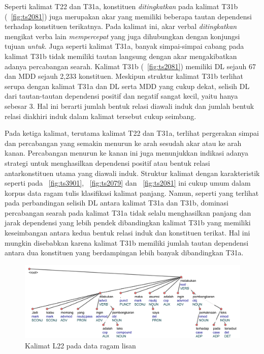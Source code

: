 Seperti kalimat T22 dan T31a, konstituen \textit{ditingkatkan} pada kalimat T31b (\pic~\ref{fig:ts2081}) juga merupakan akar yang memiliki beberapa tautan dependensi terhadap konstituen terikatnya. Pada kalimat ini, akar verbal \textit{ditingkatkan} mengikat verba lain \textit{mempercepat} yang juga dihubungkan dengan konjungsi tujuan \textit{untuk}. Juga seperti kalimat T31a, banyak simpai-simpai cabang pada kalimat T31b tidak memiliki tautan langsung dengan akar mengakibatkan adanya percabangan searah. Kalimat T31b (\pic~\ref{fig:ts2081}) memiliki DL sejauh 67 dan MDD sejauh 2,233 konstituen. Meskipun struktur kalimat T31b terlihat serupa dengan kalimat T31a dan DL serta MDD yang cukup dekat, selisih DL dari tautan-tautan dependensi positif dan negatif sangat kecil, yaitu hanya sebesar 3. Hal ini berarti jumlah bentuk relasi diawali induk dan jumlah bentuk relasi diakhiri induk dalam kalimat tersebut cukup seimbang. 

Pada ketiga kalimat, terutama kalimat T22 dan T31a, terlihat pergerakan simpai dan percabangan yang semakin menurun ke arah sesudah akar atau ke arah kanan. Percabangan menurun ke kanan ini juga menunjukkan indikasi adanya strategi untuk menghasilkan dependensi positif atau bentuk relasi antarkonstituen utama yang diawali induk. Struktur kalimat dengan karakteristik seperti pada \pic~\ref{fig:ts3901}, \pic~\ref{fig:ts2079} dan \pic~\ref{fig:ts2081} ini cukup umum dalam korpus data ragam tulis klasifikasi kalimat panjang. Namun, seperti yang terlihat pada perbandingan selisih DL antara kalimat T31a dan T31b, dominasi percabangan searah pada kalimat T31a tidak selalu menghasilkan panjang dan jarak dependensi yang lebih pendek dibandingkan kalimat T31b yang memiliki keseimbangan antara kedua bentuk relasi induk dan konstituen terikat. Hal ini mungkin disebabkan karena kalimat T31b memiliki jumlah tautan dependensi antara dua konstituen yang berdampingan lebih banyak dibandingkan T31a.

\begin{figure}
	\centering \includegraphics[width=1
	\textwidth] {pics/ls6521.jpg} 
	\caption{Kalimat L22 pada data ragam lisan} 
	\label{fig:ls6521} 
\end{figure}

